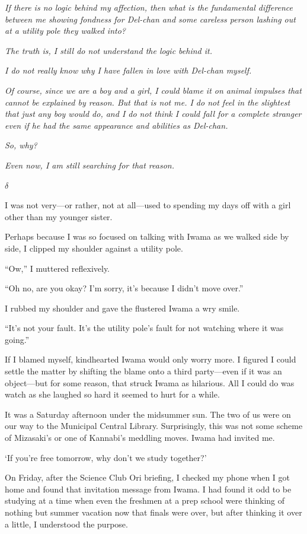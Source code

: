 \documentclass[
    a4paper,
    12pt,
    twoside,
    openany,
    UTF8,
    fontset=windows
]{ctexbook}
\begin{document}
\textit{If there is no logic behind my affection, then what is the fundamental difference between me showing fondness for Del-chan and some careless person lashing out at a utility pole they walked into?}

\textit{The truth is, I still do not understand the logic behind it.}

\textit{I do not really know why I have fallen in love with Del-chan myself.}

\textit{Of course, since we are a boy and a girl, I could blame it on animal impulses that cannot be explained by reason. But that is not me. I do not feel in the slightest that just any boy would do, and I do not think I could fall for a complete stranger even if he had the same appearance and abilities as Del-chan.}

\textit{So, why?}

\textit{Even now, I am still searching for that reason.}

$\delta$

I was not very---or rather, not at all---used to spending my days off with a girl other than my younger sister.

Perhaps because I was so focused on talking with Iwama as we walked side by side, I clipped my shoulder against a utility pole.

``Ow,'' I muttered reflexively.

``Oh no, are you okay? I'm sorry, it's because I didn't move over.''

I rubbed my shoulder and gave the flustered Iwama a wry smile.

``It's not your fault. It's the utility pole's fault for not watching where it was going.''

If I blamed myself, kindhearted Iwama would only worry more. I figured I could settle the matter by shifting the blame onto a third party---even if it was an object---but for some reason, that struck Iwama as hilarious. All I could do was watch as she laughed so hard it seemed to hurt for a while.

It was a Saturday afternoon under the midsummer sun. The two of us were on our way to the Municipal Central Library. Surprisingly, this was not some scheme of Mizasaki's or one of Kannabi's meddling moves. Iwama had invited me.

`If you're free tomorrow, why don't we study together?'

On Friday, after the Science Club Ori briefing, I checked my phone when I got home and found that invitation message from Iwama. I had found it odd to be studying at a time when even the freshmen at a prep school were thinking of nothing but summer vacation now that finals were over, but after thinking it over a little, I understood the purpose.
\end{document}
